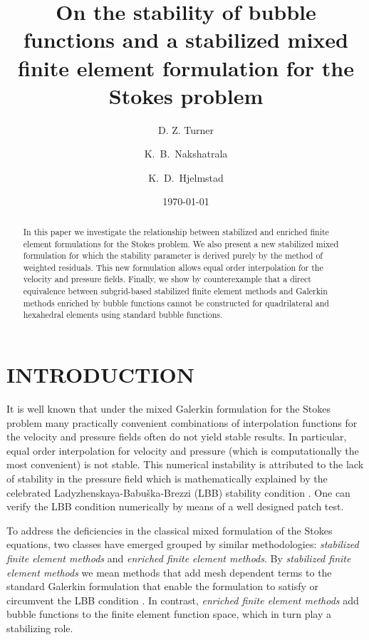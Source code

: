\documentclass[11pt]{amsart}
\title{On the stability of bubble functions and a stabilized mixed finite element formulation for the Stokes problem}
\author{D. Z. Turner} \author{K.~B.~Nakshatrala} \author{K.~D.~Hjelmstad}
\date{\today}
\begin{document}
\begin{abstract}
In this paper we investigate the relationship between stabilized and enriched finite element formulations for the Stokes problem.  We also present a new stabilized mixed formulation for which the stability parameter is derived purely by the method of weighted residuals.  This new formulation allows equal order interpolation for the velocity and pressure fields.  Finally, we show by  counterexample that a direct equivalence between subgrid-based stabilized finite element methods and Galerkin methods enriched by bubble functions cannot be constructed for quadrilateral and hexahedral elements using standard bubble functions.
\end{abstract}


\maketitle





\section{INTRODUCTION}

It is well known that under the mixed Galerkin formulation for the Stokes problem many practically convenient combinations of interpolation functions for the velocity 
and pressure fields often do not yield stable results. In particular, equal order interpolation for velocity and pressure (which is computationally the most convenient) is not stable. This numerical instability is attributed to the lack of stability in the pressure field which is mathematically explained by the celebrated Ladyzhenskaya-Babu\v ska-Brezzi (LBB) stability 
condition \cite{Brezzi}.  One can verify the LBB condition numerically by means of a well designed patch test.

To address the deficiencies in the classical mixed formulation of the Stokes equations, two classes have emerged grouped by similar methodologies: \emph{stabilized finite element methods} and \emph{enriched finite element methods}.  By \emph{stabilized finite element methods} we mean methods that add mesh dependent terms to the standard Galerkin formulation that enable the formulation to satisfy or circumvent the LBB condition \cite{Franca}.  In contrast, \emph{enriched finite element methods} add bubble functions to the finite element function space, which in turn play a stabilizing role.  
\end{document}
